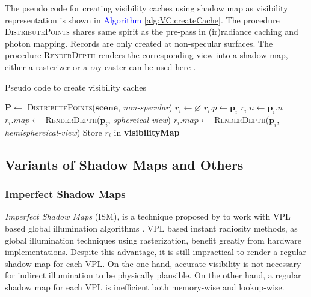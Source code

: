 \documentclass[]{book}
\begin{document}
The pseudo code for creating visibility caches using shadow map as visibility representation is shown in \textcolor{blue}{Algorithm} \ref{alg:VC:createCache}.
The procedure \textsc{DistributePoints} shares same spirit as the pre-pass in (ir)radiance caching and photon mapping.
Records are only created at non-specular surfaces.
The procedure \textsc{RenderDepth} renders the corresponding view into a shadow map, either a rasterizer or a ray caster can be used here .

\begin{algorithm}
\caption[Create Visibility Caches]{Pseudo code to create visibility caches}
\label{alg:VC:createCache}
\begin{algorithmic}[1]
		\State $\mathbf{P} \gets$ \textsc{DistributePoints}($\mathbf{scene}$, \textit{non-specular})
			\State $r_i \gets \varnothing$
			\State $r_i.p \gets \mathbf{p}_i$
			\State $r_i.n \gets \mathbf{p}_i.n$
				\State $r_i.map \gets$ \textsc{RenderDepth}($\mathbf{p}_i$, \textit{sphereical-view})
			\Else
				\State $r_i.map \gets$ \textsc{RenderDepth}($\mathbf{p}_i$, \textit{hemisphereical-view})
			\EndIf
			\State Store $r_i$ in \textbf{visibilityMap}
		\EndFor
	\EndProcedure
\end{algorithmic}
\end{algorithm}

\subsection{Variants of Shadow Maps and Others}
\label{sec:VC:represent:xSMs}

\subsubsection*{Imperfect Shadow Maps}
\textit{Imperfect Shadow Maps} (ISM), is a technique proposed by \citeauthor{ritschel2008ISM} to work with VPL based global illumination algorithms \cite{ritschel2008ISM}.
VPL based instant radiosity methods, as global illumination techniques using rasterization, benefit greatly from hardware implementations.
Despite this advantage, it is still impractical to render a regular shadow map for each VPL.
On the one hand, accurate visibility is not necessary for indirect illumination to be physically plausible.
On the other hand, a regular shadow map for each VPL is inefficient both memory-wise and lookup-wise.
\end{document}
